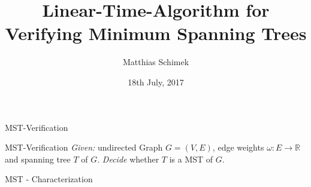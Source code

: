 \documentclass[18pt]{beamer}
\title[Linear-Time Algorithm for Verifiying MST]{Linear-Time-Algorithm for Verifying Minimum Spanning Trees}
\author{Matthias Schimek}
\institute{Institute of Theoretical Informatics}
\date{18th July, 2017}
\begin{document}

\begin{frame}
\titlepage
\end{frame}

\begin{frame}{MST-Verification}
	\begin{block}{MST-Verification}
	\emph{Given:} undirected Graph $G=(V,E)$, edge weights $\omega: E \rightarrow \mathbb{R}$ and spanning tree $T$ of $G$.
	\emph{Decide} whether $T$ is a MST of $G$.
	\end{block}
	\bigskip
	\pause
	\begin{block}{MST - Characterization}
	\end{block}
\end{frame}
\end{document}
